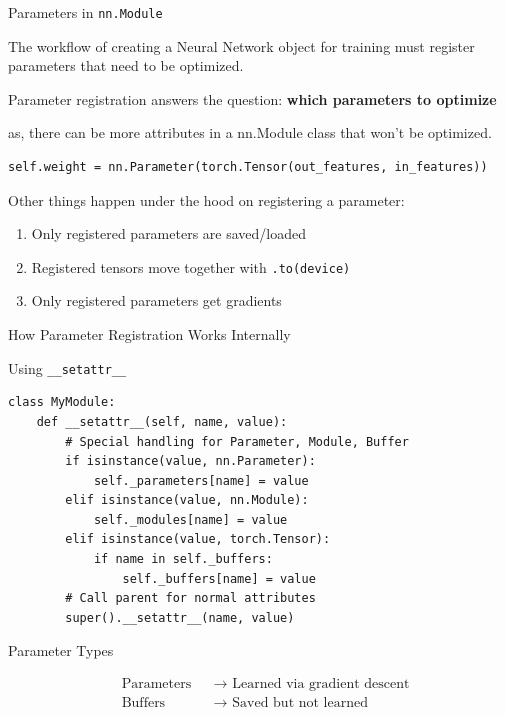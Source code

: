 \documentclass[aspectratio=169,xcolor=dvipsnames,svgnames,x11names,fleqn]{beamer}
\begin{document}
\begin{frame}[fragile]{Parameters in \texttt{nn.Module}}

The workflow of creating a Neural Network object for training must register parameters that need to be optimized.

\bigskip

Parameter registration answers the question: \textbf{which parameters to optimize}

\bigskip

as, there can be more attributes in a nn.Module class that won't be optimized.

\begin{verbatim}
self.weight = nn.Parameter(torch.Tensor(out_features, in_features))
\end{verbatim}

Other things happen under the hood on registering a parameter:


\begin{enumerate}
\item Only registered parameters are saved/loaded
\item Registered tensors move together with \texttt{.to(device)}
\item Only registered parameters get gradients
\end{enumerate}


\end{frame}


\begin{frame}[fragile]{How Parameter Registration Works Internally}
\begin{block}{Using \texttt{\_\_setattr\_\_}}
\begin{verbatim}
class MyModule:
    def __setattr__(self, name, value):
        # Special handling for Parameter, Module, Buffer
        if isinstance(value, nn.Parameter):
            self._parameters[name] = value
        elif isinstance(value, nn.Module):
            self._modules[name] = value
        elif isinstance(value, torch.Tensor):
            if name in self._buffers:
                self._buffers[name] = value
        # Call parent for normal attributes
        super().__setattr__(name, value)
\end{verbatim}
\end{block}

\footnotesize

\begin{block}{Parameter Types}

    \vspace{-15pt}

\begin{align*}
&\text{Parameters} &&\text{→ Learned via gradient descent} \\
&\text{Buffers} &&\text{→ Saved but not learned} %
\end{align*}
\end{block}
\end{frame}
\end{document}

